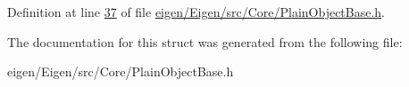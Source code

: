 Definition at line \hyperlink{eigen_2_eigen_2src_2_core_2_plain_object_base_8h_source_l00037}{37} of file \hyperlink{eigen_2_eigen_2src_2_core_2_plain_object_base_8h_source}{eigen/\+Eigen/src/\+Core/\+Plain\+Object\+Base.\+h}.



The documentation for this struct was generated from the following file\+:\begin{DoxyCompactItemize}
\item 
eigen/\+Eigen/src/\+Core/\+Plain\+Object\+Base.\+h\end{DoxyCompactItemize}

